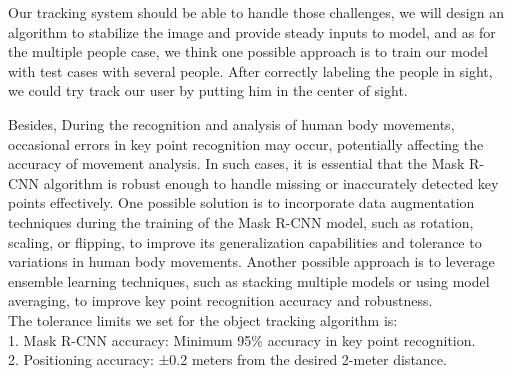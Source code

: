 Our tracking system should be able to handle those challenges, we will design an algorithm to stabilize the image and provide steady inputs to model, and as for the multiple people case, we think one possible approach is to train our model with test cases with several people. After correctly labeling the people in sight, we could try track our user by putting him in the center of sight.

Besides, During the recognition and analysis of human body movements, occasional errors in key point recognition may occur, potentially affecting the accuracy of movement analysis. In such cases, it is essential that the Mask R-CNN algorithm is robust enough to handle missing or inaccurately detected key points effectively. One possible solution is to incorporate data augmentation techniques during the training of the Mask R-CNN model, such as rotation, scaling, or flipping, to improve its generalization capabilities and tolerance to variations in human body movements. Another possible approach is to leverage ensemble learning techniques, such as stacking multiple models or using model averaging, to improve key point recognition accuracy and robustness.\\
The tolerance limits we set for the object tracking algorithm is:\\
1.	Mask R-CNN accuracy: Minimum 95\% accuracy in key point recognition.\\
2.	Positioning accuracy: ±0.2 meters from the desired 2-meter distance.